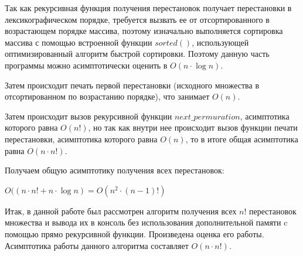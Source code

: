 \documentclass[bachelor, och, labwork]{shiza}
\begin{document}
Так как рекурсивная функция получения перестановок получает перестановки в 
лексикографическом порядке, требуется вызвать ее от отсортированного в
возрастающем порядке массива, поэтому изначально выполняется сортировка
массива с помощью встроенной функции $sorted()$, использующей оптимизированный
алгоритм быстрой сортировки. Поэтому данную часть программы можно асимптотически
оценить в $O(n\cdot\log n )$.

Затем происходит печать первой перестановки (исходного множества в
отсортированном по возрастанию порядке), что занимает $O(n)$.

Затем происходит вызов рекурсивной функции $next\_permuration$, асимптотика
которого равна $O(n!)$, но так как внутри нее происходит вызов функции печати
перестановки, асимптотика которого равна $O(n)$, то в итоге общая асимптотика
равна $O(n \cdot n!)$.


Получаем общую асимптотику получения всех перестановок: 
\begin{center}
    $O((n \cdot n! + n \cdot \log n) = O(n^2 \cdot (n-1)!)$
\end{center} 


\conclusion

Итак, в данной работе был рассмотрен алгоритм получения всех $n!$ перестановок
множества и вывода их в консоль без использования дополнительной памяти c
помощью прямо рекурсивной функции. Произведена оценка его работы. Асимптотика 
работы данного алгоритма составляет $O(n \cdot n!)$. 
\end{document}
